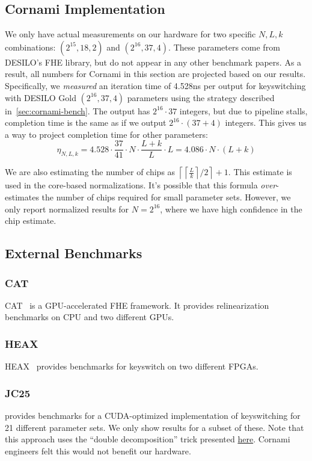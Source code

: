 \documentclass{article}
\begin{document}
	\subsection{Cornami Implementation}
	We only have actual measurements on our hardware for two specific $N,L,k$ combinations: $(2^{15}, 18, 2)$ and $(2^{16}, 37, 4)$. These parameters come from DESILO's FHE library, but do not appear in any other benchmark papers. As a result, all numbers for Cornami in this section are projected based on our results. Specifically, we \emph{measured} an iteration time of 4.528ns per output for keyswitching with DESILO Gold $(2^{16}, 37, 4)$ parameters using the strategy described in~\cref{sec:cornami-bench}. The output has $2^{16}\cdot 37$ integers, but due to pipeline stalls, completion time is the same as if we output $2^{16}\cdot (37+4)$ integers. This gives us a way to project completion time for other parameters:
	\[\eta_{N,L,k} = 4.528 \cdot \frac{37}{41} \cdot N\cdot \frac{L+k}{L} \cdot L = 4.086\cdot N\cdot (L+k)\]
	
	We are also estimating the number of chips as $\left\lceil\left\lceil\frac{L}{k}\right\rceil / 2\right\rceil + 1$. This estimate is used in the core-based normalizations. It's possible that this formula \emph{over}-estimates the number of chips required for small parameter sets. However, we only report normalized results for $N=2^{16}$, where we have high confidence in the chip estimate.
	
	\subsection{External Benchmarks}
	\subsubsection{CAT}
	CAT~\cite{li2025catgpuacceleratedfheframework} is a GPU-accelerated FHE framework. It provides relinearization benchmarks on CPU and two different GPUs.
	
	\subsubsection{HEAX}
	HEAX~\cite{riazi2020heaxarchitecturecomputingencrypted} provides benchmarks for keyswitch on two different FPGAs.
	
	\subsubsection{JC25}
	\cite{math13233809} provides benchmarks for a CUDA-optimized implementation of keyswitching for 21 different parameter sets. We only show results for a subset of these. Note that this approach uses the ``double decomposition'' trick presented \href{https://sviral-my.sharepoint.com/:p:/g/personal/ecrockett_cornami_com/IQB6mrycfbYvQJwYHyPyjougASPghF4L40EoaYXmsmJH9Ok?e=1bzd6p}{here}. Cornami engineers felt this would not benefit our hardware.
	
\end{document}
